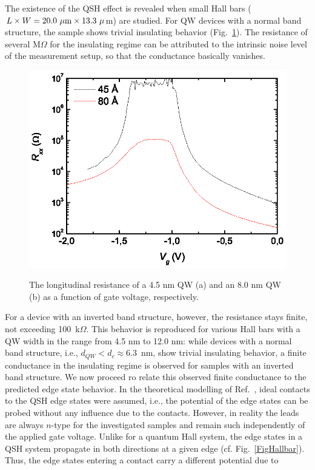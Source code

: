 \documentclass{article}
\begin{document}
 The existence of the QSH effect is revealed when
small Hall bars ($L\times W = 20.0~\mu{\rm m}\times13.3~\mu$m) are
studied. For QW devices with a normal band structure, the sample
shows trivial insulating behavior (Fig.~\ref{FigQSHEnip}). The
resistance of several M$\Omega$ for the insulating regime can be
attributed to the intrinsic noise level of the measurement setup, so
that the conductance basically vanishes.
\begin{figure}[hbt]
\centering
 \includegraphics[width=0.8\linewidth]{80608Fig13.eps}\\
 \caption{The longitudinal resistance of a 4.5 nm QW (a) and an
 8.0 nm QW (b) as a function of gate voltage, respectively.}
 \label{FigQSHEnip}
\end{figure}
For a device with an inverted band structure, however, the
resistance stays finite, not exceeding 100~k$\Omega$. This behavior
is reproduced for various Hall bars with a QW width in the range
from 4.5 nm to 12.0 nm: while devices with a normal band structure,
i.e., $d_{QW}<d_{c}\approx6.3$~nm, show trivial insulating behavior,
a finite conductance in the insulating regime is observed for
samples with an inverted band structure. We now proceed ro relate
this observed finite conductance to the predicted edge state
behavior. In the theoretical modelling of
Ref.~, ideal contacts to the QSH edge states
were assumed, i.e., the potential of the edge states can be probed
without any influence due to the contacts. However, in reality the
leads are always $n$-type for the investigated samples and remain
such independently of the applied gate voltage. Unlike for a quantum
Hall system, the edge states in a QSH system propagate in both
directions at a given edge (cf. Fig.~\ref{FigHallbar}). Thus, the
edge states entering a contact carry a different potential due to
\end{document}
